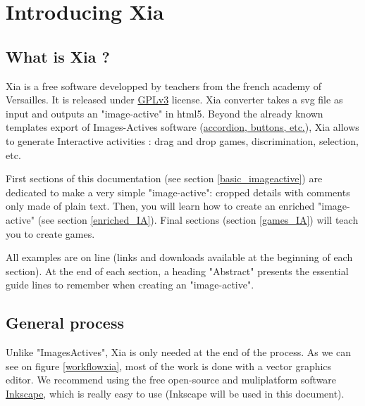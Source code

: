 


 \maketitle
 \tableofcontents
  
\section{Introducing Xia}

\subsection{What is Xia ?}

Xia is a free software developped by teachers from the french academy of Versailles.
It is released under \href{http://www.gnu.org/copyleft/gpl.html}{GPLv3} license.
Xia converter takes a svg file as input and outputs an "image-active" in 
html5. Beyond the already known templates export of Images-Actives software
(\href{http://images-actives.crdp-versailles.fr/spip.php?article11\&lang=fr}
{accordion, buttons, etc.}), Xia allows to generate
Interactive activities : drag and drop games, discrimination, selection, etc.

First sections of this documentation (see section \ref{basic_imageactive}) are dedicated to make a very simple 
"image-active": cropped details with comments only made of plain text.
Then, you will learn how to create an enriched "image-active" (see section \ref{enriched_IA}).
Final sections (section \ref{games_IA}) will teach you to create games.

\begin{astuce}
All examples are on line (links and downloads available at 
the beginning of each section). At the end
of each section, a heading "Abstract" presents the essential guide lines to 
remember when creating an "image-active". 
\end{astuce}

\subsection{General process}

Unlike "ImagesActives", Xia is only needed at the end of the process.
As we can see on figure \ref{workflowxia}, most of the work is done with 
a  vector graphics editor. We recommend using the free open-source and 
muliplatform software \href{http://www.inkscape.org/}{Inkscape}, which is 
really easy to use (Inkscape will be used in this document).

